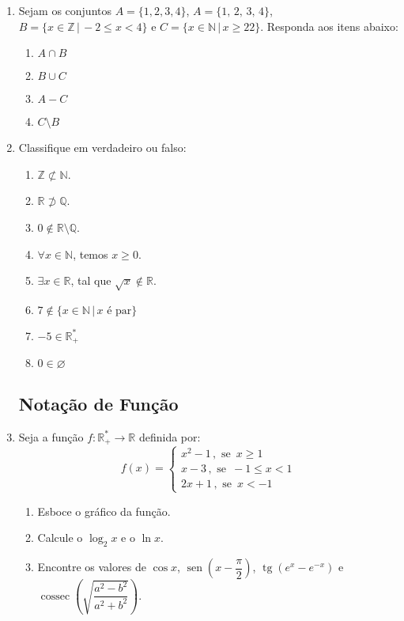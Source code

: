 \documentclass[a4paper,12pt]{article}
\DeclareMathOperator{\sen}{sen}
\DeclareMathOperator{\tg}{tg}
\DeclareMathOperator{\cossec}{cossec}
\begin{document}
\begin{enumerate}
 \item Sejam os conjuntos $A = \{1,2,3,4\}$, $A = \{1,\,2,\,3,\,4\}$,
 $B = \{x \in \mathbb{Z} \,|\, -2 \leq x < 4 \}$ e
 $C = \{x \in \mathbb{N} \,|\, x \geq 2 2\}$. Responda aos itens abaixo:
 \begin{enumerate}
  \item $A \cap B$
  \item $B \cup C$
  \item $A - C$
  \item $C \setminus B$
 \end{enumerate}
 \item Classifique em verdadeiro ou falso:
 \begin{enumerate}
  \item $\mathbb{Z} \not\subset \mathbb{N}$.
  \item $\mathbb{R} \not\supset \mathbb{Q}$.
  \item $0 \not\in \mathbb{R}\setminus\mathbb{Q}$.
  \item $\forall x \in \mathbb{N}$, temos
  $x \geq 0$.
  \item $\exists x \in \mathbb{R}$, tal que
  $\sqrt{x}\not\in\mathbb{R}$.
  \item $7 \not\in \{x\in\mathbb{N} \,|\,
  x\textrm{ é par}\}$
  \item $-5 \in \mathbb{R}^*_+$
  \item $0 \in \varnothing$
 \end{enumerate}
 
\subsection{Notação de Função} 
 
 \item Seja a função $f : \mathbb{R}^*_+ \to \mathbb{R}$
 definida por:
 $$f(x) =
  \begin{cases}
   x^2 - 1\,,\textrm{ se }\,x \geq 1 \\
   x - 3 \,,\textrm{ se }\,-1 \leq x < 1 \\
   2x + 1 \,,\textrm{ se }\,x < -1
  \end{cases}
 $$
 \begin{enumerate}
  \item Esboce o gráfico da função.
  \item Calcule o $\log_2 x$ e o $\ln x$.
  \item Encontre os valores de $\cos x$,
  $\sen \left(x - \dfrac{\pi}{2}\right)$,
  $\tg \left(e^x - e^{-x}\right)$ e
  $\cossec \left(\sqrt{\dfrac{a^2 - b^2}{a^2 + b^2}}\right)$.
 \end{enumerate}
 

\end{enumerate}
\end{document}
